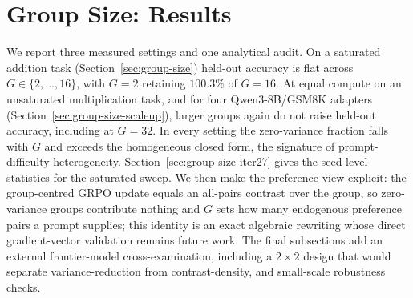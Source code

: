 \section{Group Size: Results}
\label{sec:p3-results}
We report three measured settings and one analytical audit. On a saturated
addition task (Section~\ref{sec:group-size}) held-out accuracy is flat across
$G\in\{2,\dots,16\}$, with $G{=}2$ retaining $100.3\%$ of $G{=}16$. At equal
compute on an unsaturated multiplication task, and for four Qwen3-8B/GSM8K
adapters (Section~\ref{sec:group-size-scaleup}), larger groups again do not raise
held-out accuracy, including at $G{=}32$. In every setting the zero-variance
fraction falls with $G$ and exceeds the homogeneous closed form, the signature
of prompt-difficulty heterogeneity. Section~\ref{sec:group-size-iter27} gives the
seed-level statistics for the saturated sweep. We then make the preference view
explicit: the group-centred GRPO update equals an all-pairs contrast over the
group, so zero-variance groups contribute nothing and $G$ sets how many endogenous
preference pairs a prompt supplies; this identity is an exact algebraic rewriting
whose direct gradient-vector validation remains future work. The final subsections
add an external frontier-model cross-examination, including a $2{\times}2$ design
that would separate variance-reduction from contrast-density, and small-scale
robustness checks.
